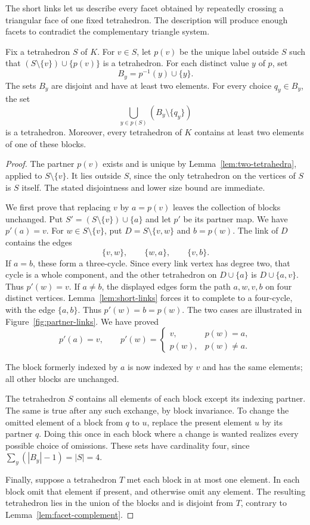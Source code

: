 The short links let us describe every facet obtained by repeatedly
crossing a triangular face of one fixed tetrahedron. The description
will produce enough facets to contradict the complementary triangle
system.

\begin{lemma}\label{lem:partner-blocks}
Fix a tetrahedron $S$ of $K$. For $v\in S$, let $p(v)$ be the unique
label outside $S$ such that
$(S\setminus\{v\})\cup\{p(v)\}$ is a tetrahedron. For each distinct
value $y$ of $p$, set
\[
 B_y=p^{-1}(y)\cup\{y\}.
\]
The sets $B_y$ are disjoint and have at least two elements. For every
choice $q_y\in B_y$, the set
\[
 \bigcup_{y\in p(S)}(B_y\setminus\{q_y\})
\]
is a tetrahedron. Moreover, every tetrahedron of $K$ contains at least two
elements of one of these blocks.
\end{lemma}

\begin{proof}
The partner $p(v)$ exists and is unique by
Lemma~\ref{lem:two-tetrahedra}, applied to $S\setminus\{v\}$. It lies
outside $S$, since the only tetrahedron on the vertices of $S$ is $S$
itself. The stated disjointness and lower size bound are immediate.

We first prove that replacing $v$ by $a=p(v)$ leaves the collection of
blocks unchanged. Put $S'=(S\setminus\{v\})\cup\{a\}$ and let $p'$
be its partner map. We have $p'(a)=v$. For $w\in S\setminus\{v\}$,
put $D=S\setminus\{v,w\}$ and $b=p(w)$. The link of $D$ contains
the edges
\[
 \{v,w\},\qquad \{w,a\},\qquad \{v,b\}.
\]
If $a=b$, these form a three-cycle. Since every link vertex has degree
two, that cycle is a whole component, and the other tetrahedron on
$D\cup\{a\}$ is $D\cup\{a,v\}$. Thus $p'(w)=v$.
If $a\ne b$, the displayed edges form the path $a,w,v,b$ on four
distinct vertices. Lemma~\ref{lem:short-links} forces it to complete
to a four-cycle, with the edge $\{a,b\}$. Thus $p'(w)=b=p(w)$.
The two cases are illustrated in Figure~\ref{fig:partner-links}.
We have proved
\[
 p'(a)=v,\qquad
 p'(w)=
 \begin{cases}
 v,&p(w)=a,\\
 p(w),&p(w)\ne a.
 \end{cases}
\]


The block formerly indexed by $a$ is now indexed by $v$ and has the
same elements; all other blocks are unchanged.

The tetrahedron $S$ contains all elements of each block except its
indexing partner. The same is true after any such exchange, by block
invariance. To change the omitted element of a block from $q$ to $u$,
replace the present element $u$ by its partner $q$. Doing this once
in each block where a change is wanted realizes every possible choice
of omissions. These sets have cardinality four, since
$\sum_y(|B_y|-1)=|S|=4$.

Finally, suppose a tetrahedron $T$ met each block in at most one
element. In each block omit that element if present, and otherwise
omit any element. The resulting tetrahedron lies in the union of the
blocks and is disjoint from $T$, contrary to
Lemma~\ref{lem:facet-complement}.
\end{proof}

